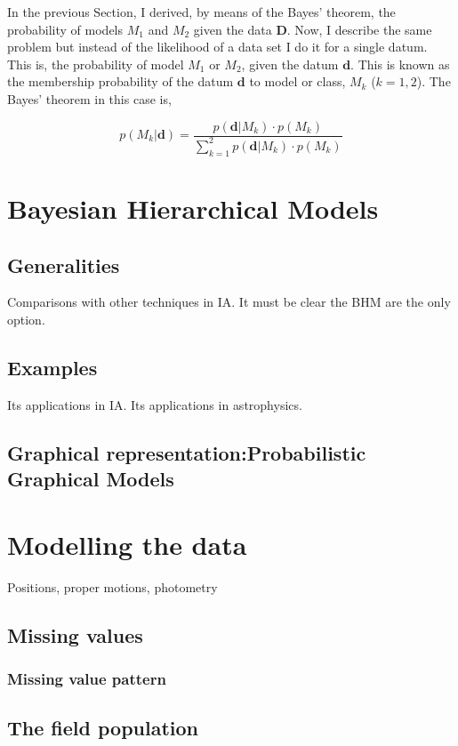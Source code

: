 In the previous Section, I derived, by means of the Bayes' theorem, the probability of models $M_1$ and $M_2$ given the data $\mathbf{D}$. Now, I describe the same problem but instead of the likelihood of a data set I do it for a single datum. This is, the probability of model $M_1$ or $M_2$, given the datum $\mathbf{d}$. This is known as the membership probability of the datum $\mathbf{d}$ to model or class, $M_k$ ($k=1,2$). The Bayes' theorem in this case is,

\begin{equation}
p( M_k | \mathbf{d}) =\frac{p(\mathbf{d}|M_k)\cdot p(M_k)}{\sum_{k=1}^2 p(\mathbf{d}|M_k)\cdot p(M_k)} 
\end{equation}





\section{Bayesian Hierarchical Models}
\subsection{Generalities}
Comparisons with other techniques in IA.
It must be clear the BHM are the only option.
\subsection{Examples}
Its applications in IA.
Its applications in astrophysics.
\subsection{Graphical representation:Probabilistic Graphical Models}

\section{Modelling the data}
Positions, proper motions, photometry
\subsection{Missing values}
\subsubsection{Missing value pattern}
\subsection{The field population}
